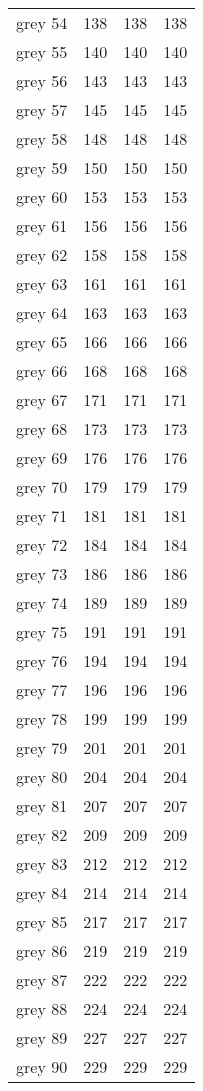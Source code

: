 \begin{center}
\begin{tabular}{llll}
  grey 54 & 138 & 138 & 138  \\
  grey 55 & 140 & 140 & 140  \\
  grey 56 & 143 & 143 & 143  \\
  grey 57 & 145 & 145 & 145  \\
  grey 58 & 148 & 148 & 148  \\
  grey 59 & 150 & 150 & 150  \\
  grey 60 & 153 & 153 & 153  \\
  grey 61 & 156 & 156 & 156  \\
  grey 62 & 158 & 158 & 158  \\
  grey 63 & 161 & 161 & 161  \\
  grey 64 & 163 & 163 & 163  \\
  grey 65 & 166 & 166 & 166  \\
  grey 66 & 168 & 168 & 168  \\
  grey 67 & 171 & 171 & 171  \\
  grey 68 & 173 & 173 & 173  \\
  grey 69 & 176 & 176 & 176  \\
  grey 70 & 179 & 179 & 179  \\
  grey 71 & 181 & 181 & 181  \\
  grey 72 & 184 & 184 & 184  \\
  grey 73 & 186 & 186 & 186  \\
  grey 74 & 189 & 189 & 189  \\
  grey 75 & 191 & 191 & 191  \\
  grey 76 & 194 & 194 & 194  \\
  grey 77 & 196 & 196 & 196  \\
  grey 78 & 199 & 199 & 199  \\
  grey 79 & 201 & 201 & 201  \\
  grey 80 & 204 & 204 & 204  \\
  grey 81 & 207 & 207 & 207  \\
  grey 82 & 209 & 209 & 209  \\
  grey 83 & 212 & 212 & 212  \\
  grey 84 & 214 & 214 & 214  \\
  grey 85 & 217 & 217 & 217  \\
  grey 86 & 219 & 219 & 219  \\
  grey 87 & 222 & 222 & 222  \\
  grey 88 & 224 & 224 & 224  \\
  grey 89 & 227 & 227 & 227  \\
  grey 90 & 229 & 229 & 229  \\

\end{tabular}
\end{center}
